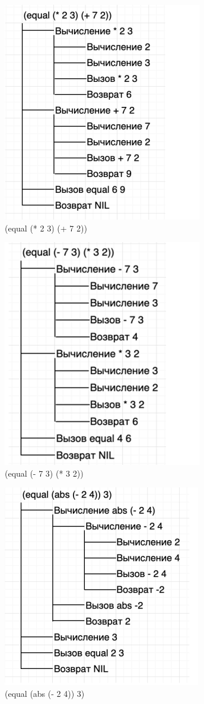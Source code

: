 \documentclass[a4paper, 12pt]{article}
\begin{document}
\begin{figure}[h!]
	\centering \includegraphics[scale=2.5]{4}
	\centering\caption{(equal (* 2 3) (+ 7 2))}
\end{figure}
\clearpage
\newpage
\begin{figure}[h!]
	\centering \includegraphics[scale=2.5]{5}
	\centering\caption{(equal (- 7 3) (* 3 2))}
\end{figure}
\begin{figure}[h!]
	\centering \includegraphics[scale=2.5]{6}
	\centering\caption{(equal (abs (- 2 4)) 3)}
\end{figure}
\end{document}
